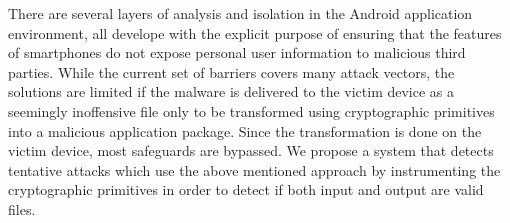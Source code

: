 There are several layers of analysis and isolation in the Android application
environment, all develope with the explicit purpose of ensuring that the
features of smartphones do not expose personal user information to malicious
third parties. While the current set of barriers covers many attack vectors,
the solutions are limited if the malware is delivered to the victim device as
a seemingly inoffensive file only to be transformed using cryptographic
primitives into a malicious application package. Since the
transformation is done on the victim device, most safeguards are bypassed. We
propose a system that detects tentative attacks which use the above mentioned
approach by instrumenting the cryptographic primitives in order to
detect if both input and output are valid files.

